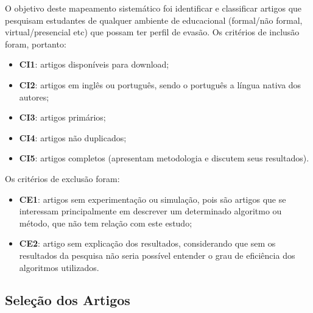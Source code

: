 O objetivo deste mapeamento sistemático foi identificar e classificar artigos que pesquisam estudantes de qualquer ambiente de educacional (formal/não formal, virtual/presencial etc) que possam ter perfil de evasão. Os critérios de inclusão foram, portanto:

\begin{itemize}
\item \textbf{CI1}: artigos disponíveis para download;
\item \textbf{CI2}: artigos em inglês ou português, sendo o português a língua nativa dos autores;
\item \textbf{CI3}: artigos primários;
\item \textbf{CI4}: artigos não duplicados;
\item \textbf{CI5}: artigos completos (apresentam metodologia e discutem seus resultados).
\end{itemize}

Os critérios de exclusão foram:
\begin{itemize}
\item \textbf{CE1}: artigos sem experimentação ou simulação, pois são artigos que se interessam principalmente em descrever um determinado algoritmo ou método, que não tem relação com este estudo;
\item \textbf{CE2}: artigo sem explicação dos resultados, considerando que sem os resultados da pesquisa não seria possível entender o grau de eficiência dos algoritmos utilizados.
\end{itemize}






\subsection{Seleção dos Artigos}\label{sec:processoPesquisa}

